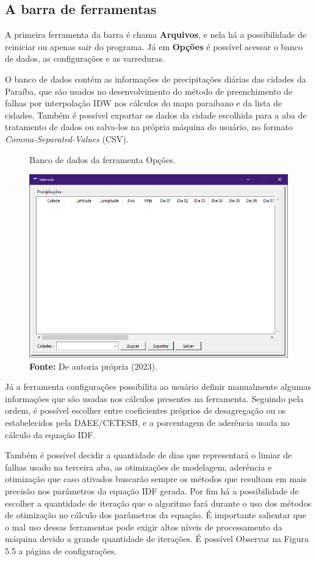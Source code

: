 \newpage

\subsection{A barra de ferramentas}

A primeira ferramenta da barra é chama \textbf{Arquivos}, e nela há a possibilidade de reiniciar ou apenas sair do programa. Já em \textbf{Opções} é possível acessar o banco de dados, as configurações e as varreduras.

O banco de dados contém as informações de precipitações diárias das cidades da Paraíba, que são usados no desenvolvimento do método de preenchimento de falhas por interpolação IDW nos cálculos do mapa paraibano e da lista de cidades. Também é possível exportar os dados da cidade escolhida para a aba de tratamento de dados ou salva-los na própria máquina do usuário, no formato \textit{Comma-Separated-Values} (CSV).\bigskip

\begin{figure}[!ht]
	\centering
	\caption{Banco de dados da ferramenta Opções.}
	\includegraphics[width=.7625\linewidth]{figuras/banco_de_dados.png}
	\caption*{\textbf{Fonte:} De autoria própria (2023).}
	\label{fig:banco_de_dados.png}
\end{figure}

Já a ferramenta configurações possibilita ao usuário definir manualmente algumas informações que são usadas nos cálculos presentes na ferramenta. Seguindo pela ordem, é possível escolher entre coeficientes próprios de desagregação ou os estabelecidos pela DAEE/CETESB, e a porcentagem de aderência usada no cálculo da equação IDF.

Também é possível decidir a quantidade de dias que representará o limiar de falhas usado na terceira aba, as otimizações de modelagem, aderência e otimização que caso ativados buscarão sempre os métodos que resultam em mais precisão nos parâmetros da equação IDF gerada. Por fim há a possibilidade de escolher a quantidade de iteração que o algoritmo fará durante o uso dos métodos de otimização no cálculo dos parâmetros da equação. É importante salientar que o mal uso dessas ferramentas pode exigir altos níveis de processamento da máquina devido a grande quantidade de iterações. É possível Observar na Figura 5.5 a página de configurações.


